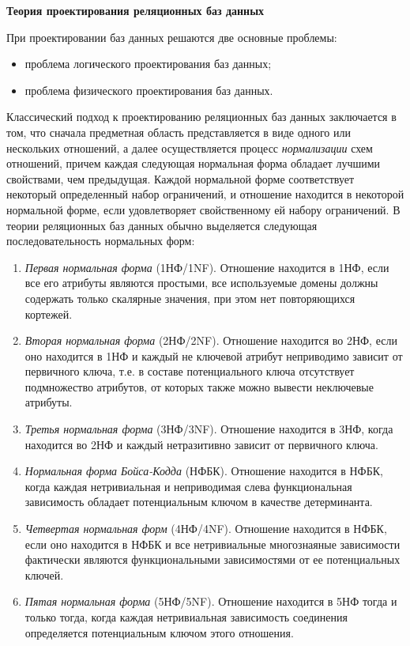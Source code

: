 \textbf{Теория проектирования реляционных баз данных}

При проектировании баз данных решаются две основные проблемы:
\begin{itemize}
	\item проблема логического проектирования баз данных;
	\item проблема физического проектирования баз данных.
\end{itemize}

Классический подход к проектированию реляционных баз данных заключается в том, что сначала предметная область представляется в виде одного или нескольких отношений, а далее осуществляется процесс \textit{нормализации} схем отношений, причем каждая следующая нормальная форма обладает лучшими свойствами, чем предыдущая.
Каждой нормальной форме соответствует некоторый определенный набор ограничений, и отношение находится в некоторой нормальной форме, если удовлетворяет свойственному ей набору ограничений.
В теории реляционных баз данных обычно выделяется следующая последовательность нормальных форм:
\begin{enumerate}
	\item \textit{Первая нормальная форма} (1НФ/1NF).
	Отношение находится в 1НФ, если все его атрибуты являются простыми, все используемые домены должны содержать только скалярные значения, при этом нет повторяющихся кортежей.
	\item \textit{Вторая нормальная форма} (2НФ/2NF).
	Отношение находится во 2НФ, если оно находится в 1НФ и каждый не ключевой атрибут неприводимо зависит от первичного ключа, т.е. в составе потенциального ключа отсутствует подмножество атрибутов, от которых также можно вывести неключевые атрибуты.
	\item \textit{Третья нормальная форма} (3НФ/3NF).
	Отношение находится в 3НФ, когда находится во 2НФ и каждый нетразитивно зависит от первичного ключа.
	\item \textit{Нормальная форма Бойса-Кодда} (НФБК).
	Отношение находится в НФБК, когда каждая нетривиальная и неприводимая слева функциональная зависимость обладает потенциальным ключом в качестве детерминанта.
	\item \textit{Четвертая нормальная форм} (4НФ/4NF).
	Отношение находится в НФБК, если оно находится в НФБК и все нетривиальные многознаяные зависимости фактически являются функциональными зависимостями от ее потенциальных ключей.
	\item \textit{Пятая нормальная форма} (5НФ/5NF).
	Отношение находится в 5НФ тогда и только тогда, когда каждая нетривиальная зависимость соединения определяется потенциальным ключом этого отношения.
\end{enumerate}

